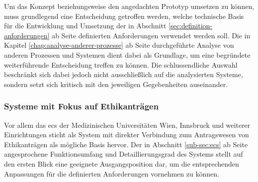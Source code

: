 \documentclass[a4paper,12pt,twoside]{scrreprt}
\begin{document}
Um das Konzept beziehungsweise den angedachten Prototyp umsetzen zu können, muss grundlegend eine Entscheidung getroffen werden, welche technische Basis für die Entwicklung und Umsetzung der in Abschnitt \ref{sec:definition-anforderungen} ab Seite \pageref{sec:definition-anforderungen} definierten Anforderungen verwendet werden soll. Die in Kapitel \ref{chap:analyse-anderer-prozesse} ab Seite \pageref{chap:analyse-anderer-prozesse} durchgeführte Analyse von anderen Prozessen und Systemen dient dabei als Grundlage, um eine begründete weiterführende Entscheidung treffen zu können. Die schlussendliche Auswahl beschränkt sich dabei jedoch nicht ausschließlich auf die analysierten Systeme, sondern setzt sich kritisch mit den jeweiligen Gegebenheiten auseinander.

\subsubsection*{Systeme mit Fokus auf Ethikanträgen}
\label{sub-sub-sec:technische-basis-fokus-ethikanträge}

Vor allem das \acl{ecs} der Medizinischen Universitäten Wien, Innsbruck und weiterer Einrichtungen sticht als System mit direkter Verbindung zum Antragswesen von Ethikanträgen als mögliche Basis hervor. Der in Abschnitt \ref{sub-sec:ecs} ab Seite \pageref{sub-sec:ecs} angesprochene Funktionsumfang und Detaillierungsgrad des Systems stellt auf den ersten Blick eine geeignete Ausgangsposition dar, um die entsprechenden Anpassungen für die definierten Anforderungen vornehmen zu können.
\end{document}

